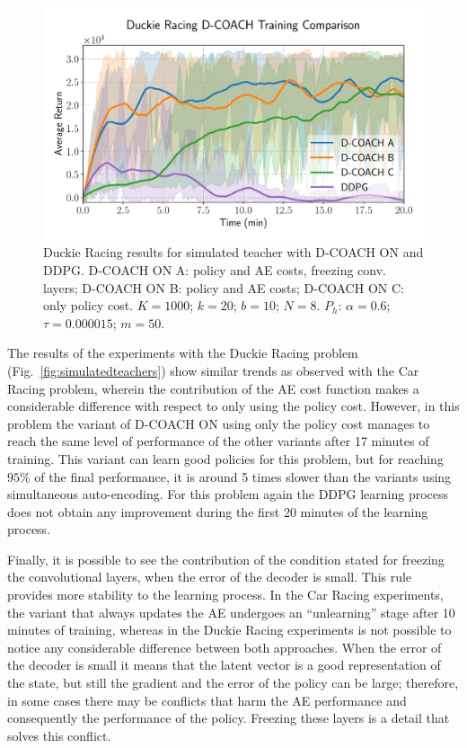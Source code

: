 \begin{figure}[h]
    \centering
    \includegraphics[width=0.9\linewidth]{imagenes/cap3/duckie_sim_ICRA.pdf}
    \caption{Duckie Racing results for simulated teacher with D-COACH ON and DDPG. D-COACH ON A: policy and AE costs, freezing conv. layers; D-COACH ON B: policy and AE costs; D-COACH ON C: only policy cost. $K = 1000$; $k=20$; $b = 10$; $N = 8$. $P_{h}$: $\alpha = 0.6$; $\tau = 0.000015$; $m=50$.}
    \label{fig:racing_car_results}
\end{figure}

The results of the experiments with the Duckie Racing problem (Fig.~\ref{fig:simulatedteachers}) show similar trends as observed with the Car Racing problem, wherein the contribution of the AE cost function makes a considerable difference with respect to only using the policy cost. However, in this problem the variant of D-COACH ON using only the policy cost manages to reach the same level of performance of the other variants after 17 minutes of training. This variant can learn good policies for this problem, but for reaching $95\%$ of the final performance, it is around 5 times slower than the variants using simultaneous auto-encoding. For this problem again the DDPG learning process does not obtain any improvement during the first 20 minutes of the learning process. 

Finally, it is possible to see the contribution of the condition stated for freezing the convolutional layers, when the error of the decoder is small. This rule provides more stability to the learning process. In the Car Racing experiments, the variant that always updates the AE undergoes an ``unlearning'' stage after 10 minutes of training, whereas in the Duckie Racing experiments is not possible to notice any considerable difference between both approaches. When the error of the decoder is small it means that the latent vector is a good representation of the state, but still the gradient and the error of the policy can be large; therefore, in some cases there may be conflicts that harm the AE performance and consequently the performance of the policy. Freezing these layers is a detail that solves this conflict.

